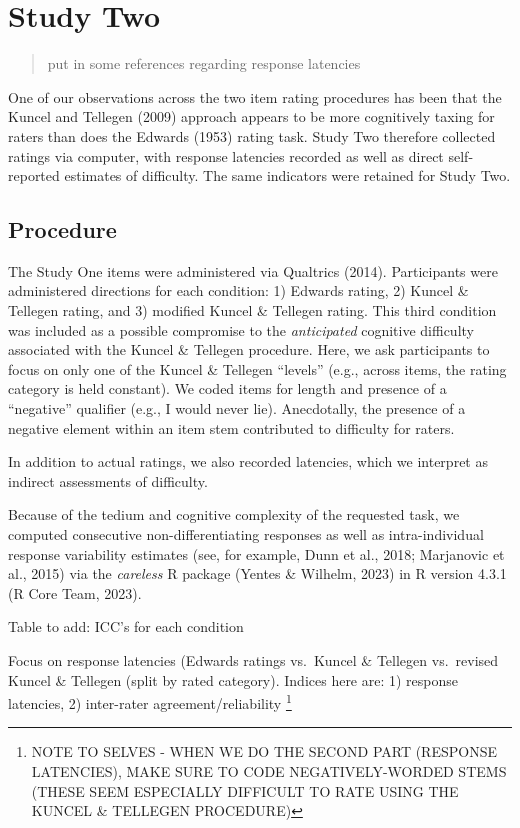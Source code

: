 \documentclass[
  ,jou]{apa6}
\begin{document}
\hypertarget{study-two}{%
\section{Study Two}\label{study-two}}

\begin{quote}
put in some references regarding response latencies
\end{quote}

One of our observations across the two item rating procedures has been that the Kuncel and Tellegen (2009) approach appears to be more cognitively taxing for raters than does the Edwards (1953) rating task. Study Two therefore collected ratings via computer, with response latencies recorded as well as direct self-reported estimates of difficulty. The same indicators were retained for Study Two.

\hypertarget{procedure-1}{%
\subsection{Procedure}\label{procedure-1}}

The Study One items were administered via Qualtrics (2014). Participants were administered directions for each condition: 1) Edwards rating, 2) Kuncel \& Tellegen rating, and 3) modified Kuncel \& Tellegen rating. This third condition was included as a possible compromise to the \emph{anticipated} cognitive difficulty associated with the Kuncel \& Tellegen procedure. Here, we ask participants to focus on only one of the Kuncel \& Tellegen ``levels'' (e.g., across items, the rating category is held constant). We coded items for length and presence of a ``negative'' qualifier (e.g., I would never lie). Anecdotally, the presence of a negative element within an item stem contributed to difficulty for raters.

In addition to actual ratings, we also recorded latencies, which we interpret as indirect assessments of difficulty.

Because of the tedium and cognitive complexity of the requested task, we computed consecutive non-differentiating responses as well as intra-individual response variability estimates (see, for example, Dunn et al., 2018; Marjanovic et al., 2015) via the \emph{careless} R package (Yentes \& Wilhelm, 2023) in R version 4.3.1 (R Core Team, 2023).

Table to add: ICC's for each condition

Focus on response latencies (Edwards ratings vs.~Kuncel \& Tellegen vs.~revised Kuncel \& Tellegen (split by rated category). Indices here are: 1) response latencies, 2) inter-rater agreement/reliability \footnote{NOTE TO SELVES - WHEN WE DO THE SECOND PART (RESPONSE LATENCIES), MAKE SURE TO CODE NEGATIVELY-WORDED STEMS (THESE SEEM ESPECIALLY DIFFICULT TO RATE USING THE KUNCEL \& TELLEGEN PROCEDURE)}
\end{document}
